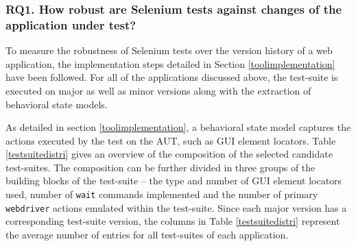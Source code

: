 \subsubsection*{{\bfseries RQ1.} How robust are Selenium tests against changes of the application under test?}
To measure the robustness of Selenium tests over the version history of a web application, the implementation steps detailed in Section \ref{toolimplementation} have been followed. 
For all of the applications discussed above, the
test-suite is executed on major as well as minor versions along with the extraction of behavioral state models. 

As detailed in section \ref{toolimplementation}, a behavioral state model captures the actions executed by the test on the AUT, such as GUI element locators. Table \ref{testsuitedistri} gives an overview of the composition of the selected candidate test-suites. The composition can be further divided in three groups of the building blocks of the test-suite -- the type and number of GUI element locators used, number of \texttt{wait} commands implemented and the number of primary \texttt{webdriver} actions emulated within the test-suite. Since each major version has a corresponding test-suite version, the columns in Table \ref{testsuitedistri} represent the average number of entries for all test-suites of each application.  


